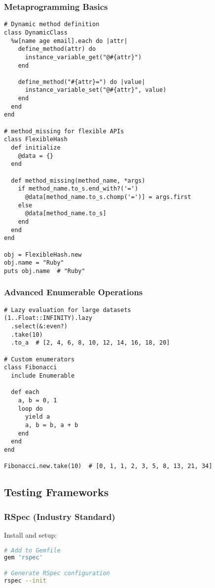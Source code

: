 \documentclass[12pt,a4paper]{article}
\begin{document}
\subsubsection{Metaprogramming Basics}

\begin{lstlisting}
# Dynamic method definition
class DynamicClass
  %w[name age email].each do |attr|
    define_method(attr) do
      instance_variable_get("@#{attr}")
    end
    
    define_method("#{attr}=") do |value|
      instance_variable_set("@#{attr}", value)
    end
  end
end

# method_missing for flexible APIs
class FlexibleHash
  def initialize
    @data = {}
  end
  
  def method_missing(method_name, *args)
    if method_name.to_s.end_with?('=')
      @data[method_name.to_s.chomp('=')] = args.first
    else
      @data[method_name.to_s]
    end
  end
end

obj = FlexibleHash.new
obj.name = "Ruby"
puts obj.name  # "Ruby"
\end{lstlisting}

\subsubsection{Advanced Enumerable Operations}

\begin{lstlisting}
# Lazy evaluation for large datasets
(1..Float::INFINITY).lazy
  .select(&:even?)
  .take(10)
  .to_a  # [2, 4, 6, 8, 10, 12, 14, 16, 18, 20]

# Custom enumerators
class Fibonacci
  include Enumerable
  
  def each
    a, b = 0, 1
    loop do
      yield a
      a, b = b, a + b
    end
  end
end

Fibonacci.new.take(10)  # [0, 1, 1, 2, 3, 5, 8, 13, 21, 34]
\end{lstlisting}

\subsection{Testing Frameworks}

\subsubsection{RSpec (Industry Standard)}

Install and setup:
\begin{lstlisting}[language=bash]
# Add to Gemfile
gem 'rspec'

# Generate RSpec configuration
rspec --init
\end{lstlisting}
\end{document}
